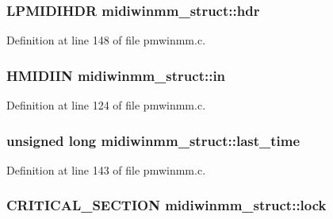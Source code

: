 \subsubsection[{\texorpdfstring{hdr}{hdr}}]{\setlength{\rightskip}{0pt plus 5cm}L\+P\+M\+I\+D\+I\+H\+DR midiwinmm\+\_\+struct\+::hdr}\hypertarget{structmidiwinmm__struct_a11e6f5498974be95186123e13507d798}{}\label{structmidiwinmm__struct_a11e6f5498974be95186123e13507d798}


Definition at line 148 of file pmwinmm.\+c.

\subsubsection[{\texorpdfstring{in}{in}}]{\setlength{\rightskip}{0pt plus 5cm}H\+M\+I\+D\+I\+IN midiwinmm\+\_\+struct\+::in}\hypertarget{structmidiwinmm__struct_afa31d3af271254689eb9243a3aa24ff9}{}\label{structmidiwinmm__struct_afa31d3af271254689eb9243a3aa24ff9}


Definition at line 124 of file pmwinmm.\+c.

\subsubsection[{\texorpdfstring{last\+\_\+time}{last_time}}]{\setlength{\rightskip}{0pt plus 5cm}unsigned long midiwinmm\+\_\+struct\+::last\+\_\+time}\hypertarget{structmidiwinmm__struct_a5f6adbb79abbc327b77d414b2c62b7a7}{}\label{structmidiwinmm__struct_a5f6adbb79abbc327b77d414b2c62b7a7}


Definition at line 143 of file pmwinmm.\+c.

\subsubsection[{\texorpdfstring{lock}{lock}}]{\setlength{\rightskip}{0pt plus 5cm}C\+R\+I\+T\+I\+C\+A\+L\+\_\+\+S\+E\+C\+T\+I\+ON midiwinmm\+\_\+struct\+::lock}\hypertarget{structmidiwinmm__struct_af5deb1b5de786de9aa215ed4bec4d6e6}{}\label{structmidiwinmm__struct_af5deb1b5de786de9aa215ed4bec4d6e6}


